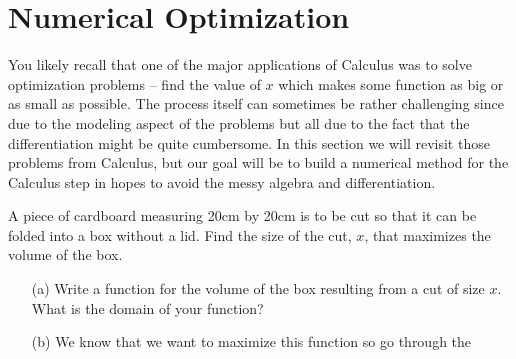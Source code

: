 \newpage\section{Numerical Optimization}
You likely recall that one of the major applications of Calculus was to solve optimization
problems -- find the value of $x$ which makes some function as big or as small as
possible.  The process itself can sometimes be rather challenging since due to the
modeling aspect of the problems but all due to the fact that the differentiation might be
quite cumbersome.  In this section we will revisit those problems from Calculus, but our
goal will be to build a numerical method for the Calculus step in hopes to avoid the messy
algebra and differentiation.

\begin{problem}\label{prob:cardboard}
    A piece of cardboard measuring 20cm by 20cm is to be cut so that it can be folded into
    a box without a lid. Find the size of the cut, $x$, that maximizes the volume of the
    box. 
    \begin{center}
    \end{center}
    \begin{enumerate}
        \item[(a)] Write a function for the volume of the box resulting from a cut of size
            $x$.  What is the domain of your function?
        \item[(b)] We know that we want to maximize this function so go through the

\end{enumerate}
\end{problem}
